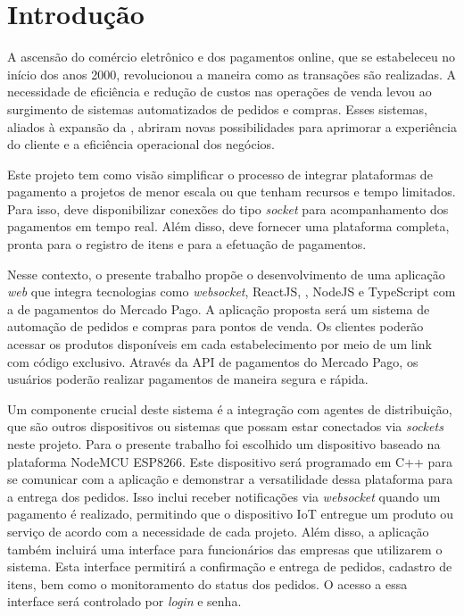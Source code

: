 \chapter{Introdução} \label{cap:intro}

A ascensão do comércio eletrônico e dos pagamentos online, que se estabeleceu no início dos anos 2000, revolucionou a maneira como as transações são realizadas. A necessidade de eficiência e redução de custos nas operações de venda levou ao surgimento de sistemas automatizados de pedidos e compras. Esses sistemas, aliados à expansão da , abriram novas possibilidades para aprimorar a experiência do cliente e a eficiência operacional dos negócios.

Este projeto tem como visão simplificar o processo de integrar plataformas de pagamento a projetos de menor escala ou que tenham recursos e tempo limitados. Para isso, deve disponibilizar conexões do tipo \textit{socket} para acompanhamento dos pagamentos em tempo real. Além disso, deve fornecer uma plataforma completa, pronta para o registro de itens e para a efetuação de pagamentos.

Nesse contexto, o presente trabalho propõe o desenvolvimento de uma aplicação \textit{web} que integra tecnologias como \textit{websocket}, ReactJS, , NodeJS e TypeScript com a  de pagamentos do Mercado Pago. A aplicação proposta será um sistema de automação de pedidos e compras para pontos de venda. Os clientes poderão acessar os produtos disponíveis em cada estabelecimento por meio de um link com código  exclusivo. Através da \gls{API} de pagamentos do Mercado Pago, os usuários poderão realizar pagamentos de maneira segura e rápida.

Um componente crucial deste sistema é a integração com agentes de distribuição, que são outros dispositivos ou sistemas que possam estar conectados via \textit{sockets} neste projeto. Para o presente trabalho foi escolhido um dispositivo baseado na plataforma NodeMCU ESP8266. Este dispositivo será programado em C++ para se comunicar com a aplicação e demonstrar a versatilidade dessa plataforma para a entrega dos pedidos. Isso inclui receber notificações via \textit{websocket} quando um pagamento é realizado, permitindo que o dispositivo \gls{IoT} entregue um produto ou serviço de acordo com a necessidade de cada projeto. Além disso, a aplicação também incluirá uma interface para funcionários das empresas que utilizarem o sistema. Esta interface permitirá a confirmação e entrega de pedidos, cadastro de itens, bem como o monitoramento do status dos pedidos. O acesso a essa interface será controlado por \textit{login} e senha.

